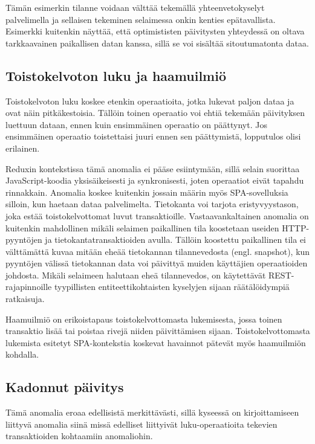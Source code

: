 \documentclass[finnish,twoside,censored,csm,sw-track-2018]{HYthesisML}
\begin{document}
Tämän esimerkin tilanne voidaan välttää tekemällä yhteenvetokyselyt palvelimella ja sellaisen tekeminen selaimessa onkin kenties epätavallista. Esimerkki kuitenkin näyttää, että optimististen päivitysten yhteydessä on oltava tarkkaavainen paikallisen datan kanssa, sillä se voi sisältää sitoutumatonta dataa.

\subsection{Toistokelvoton luku ja haamuilmiö}

Toistokelvoton luku koskee etenkin operaatioita, jotka lukevat paljon dataa ja ovat näin pitkäkestoisia. Tällöin toinen operaatio voi ehtiä tekemään päivityksen luettuun dataan, ennen kuin ensimmäinen operaatio on päättynyt. Jos ensimmäinen operaatio toistettaisi juuri ennen sen päättymistä, lopputulos olisi erilainen.

Reduxin kontekstissa tämä anomalia ei pääse esiintymään, sillä selain suorittaa JavaScript-koodia yksisäikeisesti ja synkronisesti, joten operaatiot eivät tapahdu rinnakkain. Anomalia koskee kuitenkin jossain määrin myös SPA-sovelluksia silloin, kun haetaan dataa palvelimelta. Tietokanta voi tarjota eristyvyystason, joka estää toistokelvottomat luvut transaktioille. Vastaavankaltainen anomalia on kuitenkin mahdollinen mikäli selaimen paikallinen tila koostetaan useiden HTTP-pyyntöjen ja tietokantatransaktioiden avulla. Tällöin koostettu paikallinen tila ei välttämättä kuvaa mitään eheää tietokannan tilannevedosta (engl. snapshot), kun pyyntöjen välissä tietokannan data voi päivittyä muiden käyttäjien operaatioiden johdosta. Mikäli selaimeen halutaan eheä tilannevedos, on käytettävät REST-rajapinnoille tyypillisten entiteettikohtaisten kyselyjen sijaan räätälöidympiä ratkaisuja.

Haamuilmiö on erikoistapaus toistokelvottomasta lukemisesta, jossa toinen transaktio lisää tai poistaa rivejä niiden päivittämisen sijaan. Toistokelvottomasta lukemista esitetyt SPA-kontekstia koskevat havainnot pätevät myös haamuilmiön kohdalla.

\subsection{Kadonnut päivitys}

Tämä anomalia eroaa edellisistä merkittävästi, sillä kyseessä on kirjoittamiseen liittyvä anomalia siinä missä edelliset liittyivät luku-operaatioita tekevien transaktioiden kohtaamiin anomaliohin.
\end{document}
